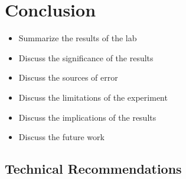 \section{Conclusion}
\begin{itemize}
    \item Summarize the results of the lab
    \item Discuss the significance of the results
    \item Discuss the sources of error
    \item Discuss the limitations of the experiment
    \item Discuss the implications of the results
    \item Discuss the future work
\end{itemize}
\subsection{Technical Recommendations}
